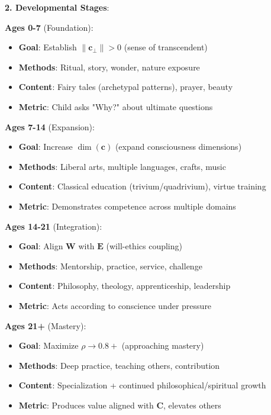 \documentclass[11pt,a4paper]{article}
\theoremstyle{definition}
\theoremstyle{remark}
\newcommand{\EE}{\mathbf{E}}
\newcommand{\WW}{\mathbf{W}}
\newcommand{\cc}{\mathbf{c}}
\begin{document}
\begin{enumerate}
\begin{protocol}
\begin{protocol}
\textbf{2. Developmental Stages}:

\textbf{Ages 0-7} (Foundation):
\begin{itemize}
    \item \textbf{Goal}: Establish \(\|\cc_\perp\| > 0\) (sense of transcendent)
    \item \textbf{Methods}: Ritual, story, wonder, nature exposure
    \item \textbf{Content}: Fairy tales (archetypal patterns), prayer, beauty
    \item \textbf{Metric}: Child asks "Why?" about ultimate questions
\end{itemize}

\textbf{Ages 7-14} (Expansion):
\begin{itemize}
    \item \textbf{Goal}: Increase \(\dim(\cc)\) (expand consciousness dimensions)
    \item \textbf{Methods}: Liberal arts, multiple languages, crafts, music
    \item \textbf{Content}: Classical education (trivium/quadrivium), virtue training
    \item \textbf{Metric}: Demonstrates competence across multiple domains
\end{itemize}

\textbf{Ages 14-21} (Integration):
\begin{itemize}
    \item \textbf{Goal}: Align \(\WW\) with \(\EE\) (will-ethics coupling)
    \item \textbf{Methods}: Mentorship, practice, service, challenge
    \item \textbf{Content}: Philosophy, theology, apprenticeship, leadership
    \item \textbf{Metric}: Acts according to conscience under pressure
\end{itemize}

\textbf{Ages 21+} (Mastery):
\begin{itemize}
    \item \textbf{Goal}: Maximize \(\rho \to 0.8+\) (approaching mastery)
    \item \textbf{Methods}: Deep practice, teaching others, contribution
    \item \textbf{Content}: Specialization + continued philosophical/spiritual growth
    \item \textbf{Metric}: Produces value aligned with \(\mathbf{C}\), elevates others
\end{itemize}


\end{protocol}
\end{protocol}
\end{enumerate}
\end{document}
